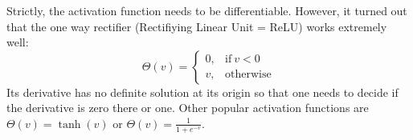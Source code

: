 \documentclass[12pt]{article}
\begin{document}
Strictly, the activation function needs to be differentiable. However,
it turned out that the one way rectifier (Rectifiying Linear Unit = ReLU)
works extremely well:
\begin{equation}
  \Theta(v) =
  \begin{cases}
    0, & \text{if}\ v < 0 \\
    v, & \text{otherwise}
  \end{cases}
\end{equation}
Its derivative has no definite solution at its origin so that one needs
to decide if the derivative is zero there or one.
Other popular activation functions are $\Theta(v)=\tanh(v)$ or $\Theta(v)=\frac{1}{1+e^{-v}}$.
\end{document}
